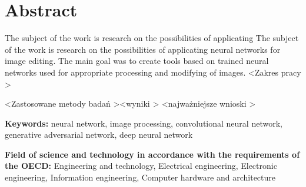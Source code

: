 \section*{Abstract}
  The subject of the work is research on the possibilities of applicating
  The subject of the work is research on the possibilities of applicating
  neural networks for image editing. The main goal was to create tools based on
  trained neural networks used for appropriate processing and modifying of
  images. \textless Zakres pracy \textgreater

  \textless Zastosowane metody badań \textgreater \textless wyniki \textgreater
  \textless najważniejsze wnioski \textgreater

  \bigskip

  \noindent\textbf{Keywords:} neural network, image processing, convolutional
  neural network, generative adversarial network, deep neural network

  \bigskip

  \noindent\textbf{Field of science and technology in accordance with the
  requirements of the OECD:} Engineering and technology, Electrical engineering,
  Electronic engineering, Information engineering, Computer hardware and
  architecture
